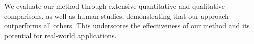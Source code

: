 We evaluate our method through extensive quantitative and qualitative comparisons, as well as human studies, demonstrating that our approach outperforms all others. This underscores the effectiveness of our method and its potential for real-world applications.


